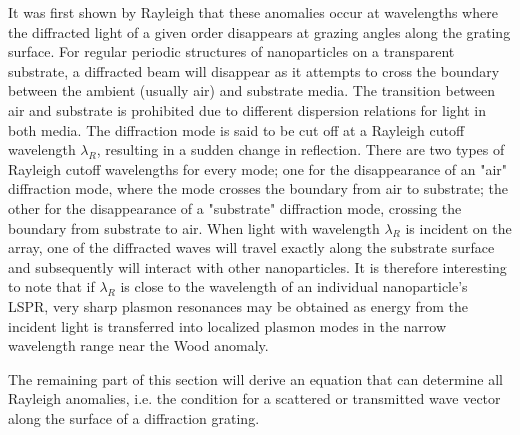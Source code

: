  It was first shown by Rayleigh that these anomalies occur at wavelengths where the diffracted light of a given order disappears at grazing angles along the grating surface\cite{Rayleigh_onWood1907}\cite{Rayleigh_onGratings1907}. For regular periodic structures of nanoparticles on a transparent substrate, a diffracted beam will disappear as it attempts to cross the boundary between the ambient (usually air) and substrate media. The transition between air and substrate is prohibited due to different dispersion relations for light in both media. The diffraction mode is said to be cut off at a Rayleigh cutoff wavelength $\lambda_R$, resulting in a sudden change in reflection. There are two types of Rayleigh cutoff wavelengths for every mode; one for the disappearance of an "air" diffraction mode, where the mode crosses the boundary from air to substrate; the other for the disappearance of a "substrate" diffraction mode, crossing the boundary from substrate to air. %
When light with wavelength $\lambda_R$ is incident on the array, one of the diffracted waves will travel exactly along the substrate surface and subsequently will interact with other nanoparticles. It is therefore interesting to note that if $\lambda_R$ is close to the wavelength of an individual nanoparticle's LSPR, very sharp plasmon resonances may be obtained as energy from the incident light is transferred into localized plasmon modes in the narrow wavelength range near the Wood anomaly\cite{narrowLSPRfromDiffractionCoupling}.


The remaining part of this section will derive an equation that can determine all Rayleigh anomalies, i.e. the condition for a scattered or transmitted wave vector along the surface of a diffraction grating. 

